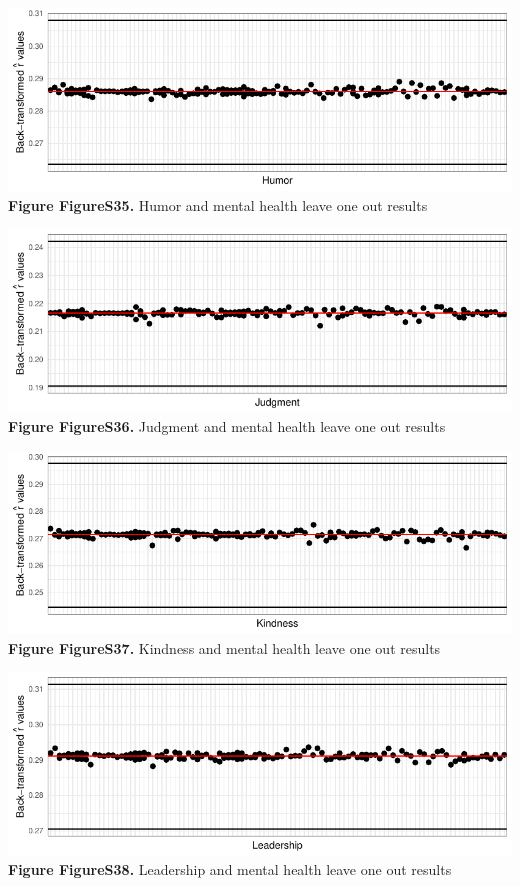 \documentclass[
  letterpaper,
  DIV=11,
  numbers=noendperiod]{scrartcl}
\begin{document}
\includegraphics{SupplementaryResults_files/figure-pdf/unnamed-chunk-12-11.pdf}\textbf{Figure
FigureS35.} Humor and mental health leave one out results

\includegraphics{SupplementaryResults_files/figure-pdf/unnamed-chunk-12-12.pdf}\textbf{Figure
FigureS36.} Judgment and mental health leave one out results

\includegraphics{SupplementaryResults_files/figure-pdf/unnamed-chunk-12-13.pdf}\textbf{Figure
FigureS37.} Kindness and mental health leave one out results

\includegraphics{SupplementaryResults_files/figure-pdf/unnamed-chunk-12-14.pdf}\textbf{Figure
FigureS38.} Leadership and mental health leave one out results
\end{document}
